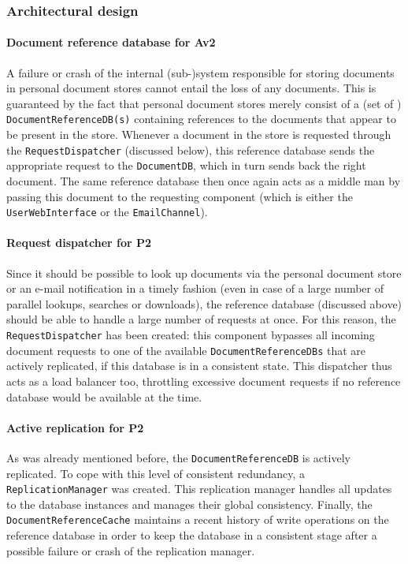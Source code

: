 \documentclass[a4paper,10pt]{article}
\begin{document}
\subsubsection{Architectural design}
\paragraph{Document reference database for Av2}
A failure or crash of the internal (sub-)system responsible for storing documents in personal document stores cannot entail the loss of any documents. This is guaranteed by the fact that personal document stores merely consist of a (set of ) \texttt{DocumentReferenceDB(s)} containing references to the documents that appear to be present in the store. Whenever a document in the store is requested through the \texttt{RequestDispatcher} (discussed below), this reference database sends the appropriate request to the \texttt{DocumentDB}, which in turn sends back the right document. The same reference database then once again acts as a middle man by passing this document to the requesting component (which is either the \texttt{UserWebInterface} or the \texttt{EmailChannel}).


\paragraph{Request dispatcher for P2}
Since it should be possible to look up documents via the personal document store or an e-mail notification in a timely fashion (even in case of a large number of parallel lookups, searches or downloads), the reference database (discussed above) should be able to handle a large number of requests at once. For this reason, the \texttt{RequestDispatcher} has been created: this component bypasses all incoming document requests to one of the available \texttt{DocumentReferenceDBs} that are actively replicated, if this database is in a consistent state. This dispatcher thus acts as a load balancer too, throttling excessive document requests if no reference database would be available at the time.

\paragraph{Active replication for P2}
As was already mentioned before, the \texttt{DocumentReferenceDB} is actively replicated. To cope with this level of consistent redundancy, a \texttt{ReplicationManager} was created. This replication manager handles all updates to the database instances and manages their global consistency. Finally, the \texttt{DocumentReferenceCache} maintains a recent history of write operations on the reference database in order to keep the database in a consistent stage after a possible failure or crash of the replication manager.
\end{document}
